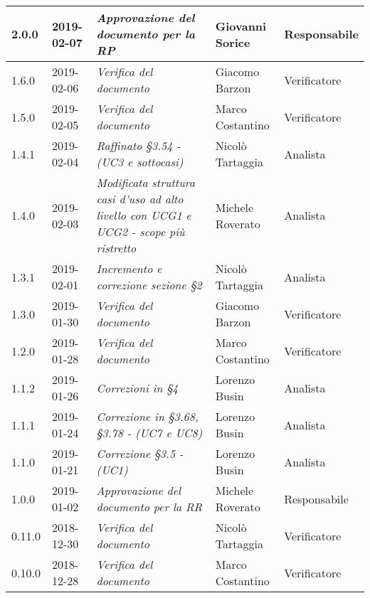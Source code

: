 \begin{longtable}{C{2cm}|C{2.5cm}|C{4.5cm}|C{2.5cm}|C{3cm}}
		2.0.0 & 2019-02-07 & \emph{Approvazione del documento per la RP} & Giovanni Sorice & Responsabile \\
		\hline
	
		1.6.0 & 2019-02-06 & \emph{Verifica del documento} & Giacomo Barzon & Verificatore \\
		\hline
		
		1.5.0 & 2019-02-05 & \emph{Verifica del documento} & Marco Costantino & Verificatore \\
		\hline
	
		1.4.1 & 2019-02-04 & \emph{Raffinato §3.54 -  (UC3 e sottocasi)} & Nicolò Tartaggia & Analista \\
		\hline
	
		1.4.0 & 2019-02-03 & \emph{Modificata struttura casi d'uso ad alto livello con UCG1 e UCG2 - scope più ristretto} & Michele Roverato & Analista \\
		\hline
	
		1.3.1 & 2019-02-01 & \emph{Incremento e correzione sezione §2} & Nicolò Tartaggia & Analista \\
		\hline
	
		1.3.0 & 2019-01-30 & \emph{Verifica del documento} & Giacomo Barzon & Verificatore \\
		\hline
		
		1.2.0 & 2019-01-28 & \emph{Verifica del documento} & Marco Costantino & Verificatore \\
		\hline
	
		1.1.2 & 2019-01-26 & \emph{Correzioni in §4} & Lorenzo Busin & Analista \\
		\hline
	
		1.1.1 & 2019-01-24 & \emph{Correzione in §3.68, §3.78 - (UC7 e UC8)} & Lorenzo Busin & Analista \\
		\hline	
	
		1.1.0 & 2019-01-21 & \emph{Correzione §3.5 - (UC1)} & Lorenzo Busin & Analista \\
		\hline
		
		1.0.0 & 2019-01-02 & \emph{Approvazione del documento per la RR} & Michele Roverato & Responsabile \\
		\hline
		
		0.11.0 & 2018-12-30 & \emph{Verifica del documento} & Nicolò Tartaggia & Verificatore \\
		\hline
		
		0.10.0 & 2018-12-28 & \emph{Verifica del documento} & Marco Costantino & Verificatore \\
		\hline
		

\end{longtable}
